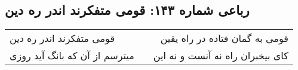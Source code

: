 \begin{center}
\section*{رباعی شماره ۱۴۳: قومی متفکرند اندر ره دین}
\label{sec:sh143}
\begin{longtable}{l p{0.5cm} r}
قومی متفکرند اندر ره دین
&&
قومی به گمان فتاده در راه یقین
\\
میترسم از آن که بانگ آید روزی
&&
کای بیخبران راه نه آنست و نه این
\\
\end{longtable}
\end{center}
